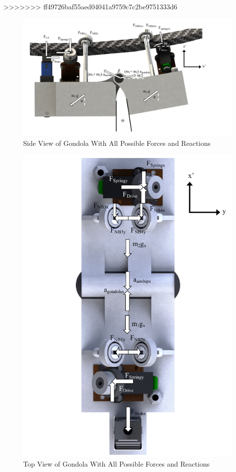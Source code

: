 \documentclass[../main.tex]{subfiles}
\begin{document}
>>>>>>> ff49726baf55aed04041a9759c7c2be9751333d6
\begin{figure}[H]
	\centering
	\includegraphics[width=1.1\linewidth]{img/gondola/bentGondolaSideAllForces.pdf}
	\caption{Side View of Gondola With All Possible Forces and Reactions}
	\label{fig:bentGondolaSideAllForce}
\end{figure}
\begin{figure}[H]
	\centering
	\includegraphics[width=1\textwidth]{img/gondola/bentGondolaTopAllForces.pdf}
	\caption{Top View of Gondola With All Possible Forces and Reactions}
	\label{fig:bentGondolaTopAllForce}
\end{figure}
\end{document}
